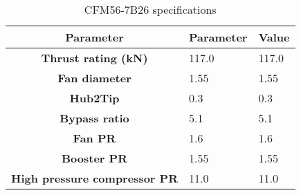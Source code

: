 \begin{table}[h!]
  \centering
  \begin{tabularx}{\textwidth}{||c|X|X||}
  \hline
    \cellcolor{gray!20}\textbf{Parameter} & \cellcolor{gray!20}\textbf{Parameter} & \cellcolor{gray!20}\textbf{Value} \\ [0.5ex]
  \hline\hline
\centering
    \cellcolor{gray!20}\textbf{Thrust rating (kN)} & 117.0 & 117.0 \\
  \hline
    \cellcolor{gray!20}\textbf{Fan diameter} & 1.55 & 1.55 \\
  \hline
    \cellcolor{gray!20}\textbf{Hub2Tip} & 0.3 & 0.3 \\
  \hline
    \cellcolor{gray!20}\textbf{Bypass ratio} & 5.1 & 5.1 \\
  \hline
    \cellcolor{gray!20}\textbf{Fan PR} & 1.6 & 1.6 \\
  \hline
    \cellcolor{gray!20}\textbf{Booster PR} & 1.55 & 1.55 \\
  \hline
    \cellcolor{gray!20}\textbf{High pressure compressor PR} & 11.0 & 11.0 \\
  \hline
  \end{tabularx}
  \caption{CFM56-7B26 specifications}
  \label{tab:specs}
\end{table}
